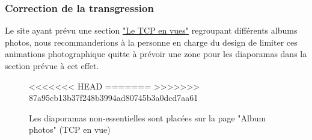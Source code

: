 \documentclass{article}[12pt]
\begin{document}
    	    \subsubsection*{Correction de la transgression}
	    	    Le site ayant prévu une section  \href{http://www.tennisclubdeparis.fr/album-photo.html}{"Le TCP en vues"} regroupant différents albums photos, nous recommanderions à la personne en charge du design de limiter ces animations photographique quitte à prévoir une zone pour les diaporamas dans la section prévue à cet effet.
	    	      \begin{figure}[H]
	    	      	\centering
<<<<<<< HEAD
=======
>>>>>>> 87a95cb13b37f248b3994ad80745b3a0dcd7aa61
	    	      	\caption{Les diaporamas non-essentielles sont placées sur la page "Album photos" (TCP en vue)}
	    	      \end{figure}
\end{document}
